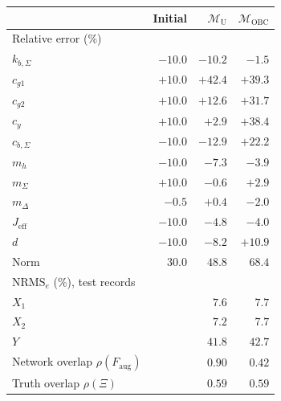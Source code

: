 \setlength{\tabcolsep}{4pt}
\begin{tabular}{l r r r}
\toprule
 & Initial & $\mathcal{M}_{\mathrm{U}}$ & $\mathcal{M}_{\mathrm{OBC}}$\\
\midrule
\multicolumn{4}{l}{Relative error (\%)}\\
$k_{b,\Sigma}$ & $-10.0$ & $-10.2$ & $-1.5$\\
$c_{g1}$ & $+10.0$ & $+42.4$ & $+39.3$\\
$c_{g2}$ & $+10.0$ & $+12.6$ & $+31.7$\\
$c_y$ & $+10.0$ & $+2.9$ & $+38.4$\\
$c_{b,\Sigma}$ & $-10.0$ & $-12.9$ & $+22.2$\\
$m_h$ & $-10.0$ & $-7.3$ & $-3.9$\\
$m_\Sigma$ & $+10.0$ & $-0.6$ & $+2.9$\\
$m_\Delta$ & $-0.5$ & $+0.4$ & $-2.0$\\
$J_{\mathrm{eff}}$ & $-10.0$ & $-4.8$ & $-4.0$\\
$d$ & $-10.0$ & $-8.2$ & $+10.9$\\
Norm & $30.0$ & $48.8$ & $68.4$\\
\midrule
\multicolumn{4}{l}{$\mathrm{NRMS}_e$ (\%), test records}\\
$X_1$ &  & $7.6$ & $7.7$\\
$X_2$ &  & $7.2$ & $7.7$\\
$Y$ &  & $41.8$ & $42.7$\\
\midrule
Network overlap $\rho(F_{\mathrm{aug}})$ &  & $0.90$ & $0.42$\\
Truth overlap $\rho(\Xi)$ &  & $0.59$ & $0.59$\\
\bottomrule
\end{tabular}
